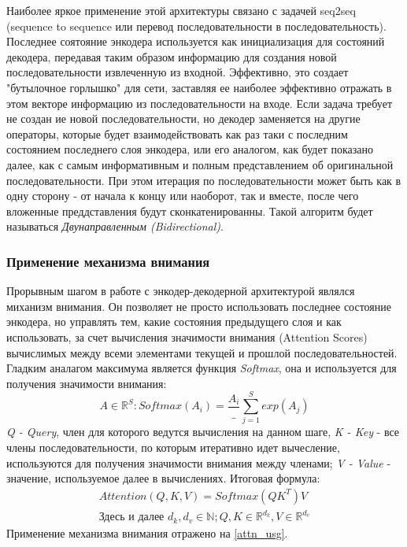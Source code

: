 \newline
Наиболее яркое применение этой архитектуры связано с задачей seq2seq (sequence to sequence или перевод последовательности в последовательность). Последнее соятояние энкодера используется как инициализация для состояний декодера, передавая таким образом информацию для создания новой последовательности извлеченную из входной. Эффективно, это создает "бутылочное горлышко" для сети, заставляя ее наиболее эффективно отражать в этом векторе информацию из последовательности на входе.
\newline
Если задача требует не создан ие новой последовательности, но декодер заменяется на другие операторы, которые будет взаимодействовать как раз таки с последним состоянием последнего слоя энкодера, или его аналогом, как будет показано далее, как с самым информативным и полным представлением об оригинальной последовательности.
\newline
При этом итерация по последовательности может быть как в одну сторону - от начала к концу или наоборот, так и вместе, после чего вложенные преддставления будут сконкатенированны. Такой алгоритм будет называться \textit{Двунаправленным (Bidirectional)}.
\subsubsection{Применение механизма внимания}
Прорывным шагом в работе с энкодер-декодерной архитектурой являлся миханизм внимания\cite{Attention}. Он позволяет не просто использовать последнее состояние энкодера, но управлять тем, какие состояния предыдущего слоя и как использовать, за счет вычисления значимости внимания (Attention Scores) вычислимых между всеми элементами текущей и прошлой последовательностей.
\newline
Гладким аналагом максимума является функция \textit{Softmax}, она и используется для получения значимости внимания:
\begin{equation} \label{softmax} 
\nonumber A \in \mathds{R}^{S}: Softmax(A_{i}) = \frac{A_{i}}_{\sum_{j=1}^{S}exp(A_{j})}
\end{equation}
\textit{Q - Query}, член для которого ведутся вычисления на данном шаге, \textit{K - Key} - все члены последовательности, по которым итеративно идет вычесление, используются для получения значимости внимания между членами; \textit{V - Value} - значение, используемое далее в вычислениях.
Итоговая формула:
\begin{gather} \label{dot_product_att_w/o_scale} 
Attention(Q,K,V) = Softmax \left(QK^{T}\right)V\\
\nonumber \textit{Здесь и далее } d_{k}, d_{v} \in \mathds{N}; Q, K \in \mathds{R}^{d_{k}}, V \in \mathds{R}^{d_{v}}
\end{gather}
Применение механизма внимания отражено на \ref{attn_usg}.

